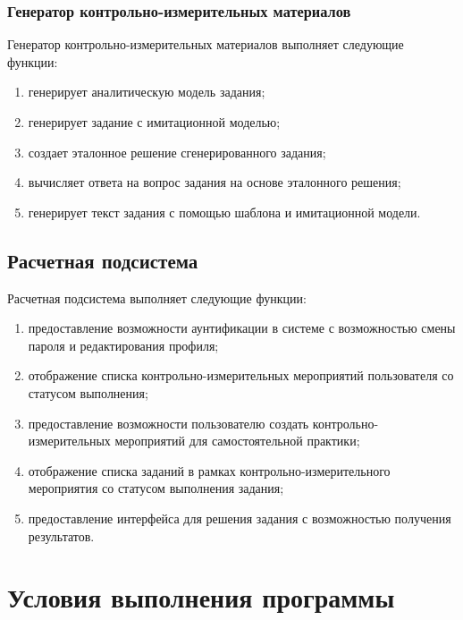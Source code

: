 \documentclass[a4paper,12pt,reqno]{article}
\begin{document}
    \subsubsection{Генератор контрольно-измерительных материалов}
    Генератор контрольно-измерительных материалов выполняет следующие функции:
    \begin{enumerate}
        \item генерирует аналитическую модель задания;
        \item генерирует задание с имитационной моделью;
        \item создает эталонное решение сгенерированного задания;
        \item вычисляет ответа на вопрос задания на основе эталонного решения;
        \item генерирует текст задания с помощью шаблона и имитационной модели.
    \end{enumerate}

    \subsection{Расчетная подсистема}
    Расчетная подсистема выполняет следующие функции:
    \begin{enumerate}
        \item предоставление возможности аунтификации в системе с возможностью смены пароля и редактирования профиля;
        \item отображение списка контрольно-измерительных мероприятий пользователя со статусом выполнения;
        \item предоставление возможности пользователю создать контрольно-измерительных мероприятий для самостоятельной практики;
        \item отображение списка заданий в рамках контрольно-измерительного мероприятия со статусом выполнения задания;
        \item предоставление интерфейса для решения задания с возможностью получения результатов.
    \end{enumerate}

    \newpage


    \section{Условия выполнения программы}
\end{document}
